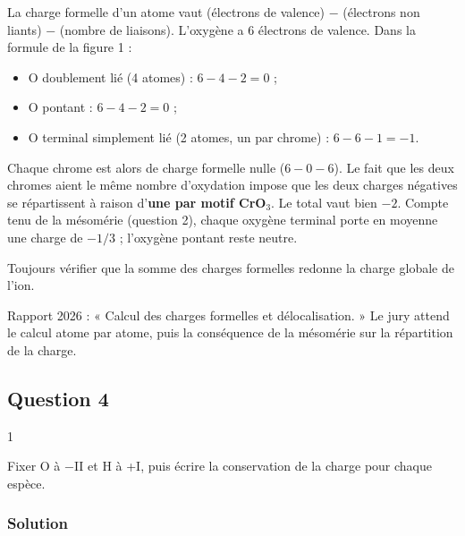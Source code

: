 \documentclass[11pt,a4paper]{article}
\providecommand{\tightlist}{\setlength{\itemsep}{0pt}\setlength{\parskip}{0pt}}
\begin{document}
La charge formelle d'un atome vaut (électrons de valence) − (électrons non liants) − (nombre de liaisons). L'oxygène a 6 électrons de valence. Dans la formule de la figure 1 :

\begin{itemize}
\tightlist
\item
  O doublement lié (4 atomes) : \(6-4-2=0\) ;
\item
  O pontant : \(6-4-2=0\) ;
\item
  O terminal simplement lié (2 atomes, un par chrome) : \(6-6-1=-1\).
\end{itemize}

Chaque chrome est alors de charge formelle nulle (\(6-0-6\)). Le fait que les deux chromes aient le même nombre d'oxydation impose que les deux charges négatives se répartissent à raison d'\textbf{une par motif CrO\(_3\)}. Le total vaut bien \(-2\). Compte tenu de la mésomérie (question 2), chaque oxygène terminal porte en moyenne une charge de \(-1/3\) ; l'oxygène pontant reste neutre.

\begin{methode}

Toujours vérifier que la somme des charges formelles redonne la charge globale de l'ion.

\end{methode}

\begin{jury}

Rapport 2026 : « Calcul des charges formelles et délocalisation. » Le jury attend le calcul atome par atome, puis la conséquence de la mésomérie sur la répartition de la charge.

\end{jury}

\hypertarget{question-4}{%
\subsection{Question 4}\label{question-4}}

\begin{indication}{1}

Fixer O à −II et H à +I, puis écrire la conservation de la charge pour chaque espèce.

\end{indication}

\hypertarget{solution-3}{%
\subsubsection{Solution}\label{solution-3}}
\end{document}
